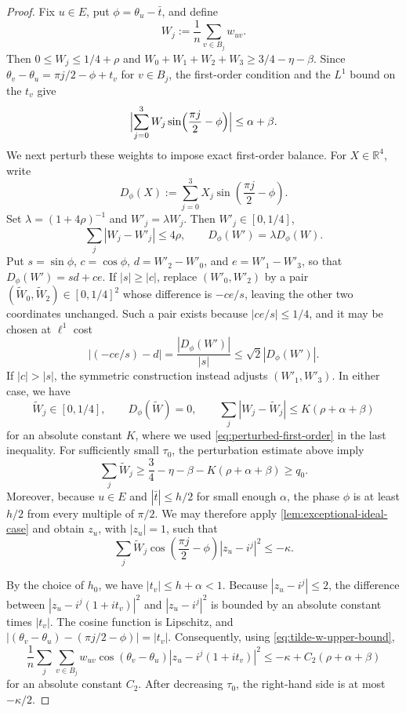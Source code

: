 \documentclass[10pt,a4paper]{amsart}
\newcommand{\RR}{\mathbb{R}}
\newcommand{\abs}[1]{\left\lvert #1\right\rvert}
\newcommand{\paren}[1]{\left(#1\right)}
\begin{document}
\begin{proof}
Fix $u\in E$, put $\phi=\theta_u-\bar t$, and define
\[
    W_j:=\frac1n\sum_{v\in B_j}w_{uv}.
\]
Then $0\le W_j\le1/4+\rho$ and $W_0 + W_1 + W_2 + W_3 \geq 3/4 - \eta - \beta$. Since $\theta_v-\theta_u=\pi j/2-\phi+t_v$ for $v\in B_j$, the
first-order condition and the $L^1$ bound on the $t_v$ give
\begin{equation}\label{eq:perturbed-first-order}
\Bigl|{\sum_{j=0}^3W_j\sin\Bigl({\frac{\pi j}{2}-\phi}\Bigr)}\Bigr|
\le\alpha+\beta.
\end{equation}
We next perturb these weights to impose exact first-order balance.  For
$X\in\RR^4$, write
\[
    D_\phi(X):=\sum_{j=0}^3X_j
        \sin\paren{\frac{\pi j}{2}-\phi}.
\]
Set $\lambda=(1+4\rho)^{-1}$ and $W'_j=\lambda W_j$.  Then
$W'_j\in[0,1/4]$,
\[
    \sum_j\abs{W_j-W'_j}\le4\rho,
    \qquad
    D_\phi(W')=\lambda D_\phi(W).
\]
Put $s=\sin\phi$, $c=\cos\phi$, $d=W'_2-W'_0$, and
$e=W'_1-W'_3$, so that $D_\phi(W')=sd+ce$.  If
$\abs s\ge\abs c$, replace $(W'_0,W'_2)$ by a pair
$(\tilde W_0,\tilde W_2)\in[0,1/4]^2$ whose difference is
$-ce/s$, leaving the other two coordinates unchanged.  Such a pair exists
because $\abs{ce/s}\le1/4$, and it may be chosen at $\ell^1$ cost
\[
    \abs{(-ce/s)-d}
    =\frac{\abs{D_\phi(W')}}{\abs s}
    \le\sqrt2|{D_\phi(W')}|.
\]
If $\abs c>\abs s$, the symmetric construction instead adjusts
$(W'_1,W'_3)$.  In either case, we have
\[
    \tilde W_j\in[0,1/4],
    \qquad
    D_\phi(\tilde W)=0,
    \qquad
    \sum_j|{W_j-\tilde W_j}|
    \le K(\rho+\alpha+\beta)
\]
for an absolute constant $K$, where we used
\eqref{eq:perturbed-first-order} in the last inequality. For sufficiently small $\tau_0$, the perturbation estimate above imply
\[
    \sum_j\tilde W_j
    \ge\frac34-\eta-\beta-K(\rho+\alpha+\beta)\ge q_0.
\]
Moreover, because $u\in E$ and
$\abs{\bar t}\le h/2$ for small enough $\alpha$, the phase $\phi$ is at least $h/2$ from every
multiple of $\pi/2$.  We may therefore apply
\cref{lem:exceptional-ideal-case} and obtain $z_u$, with
$\abs{z_u}=1$, such that
\begin{equation}\label{eq:tilde-w-upper-bound}
\sum_j\tilde W_j\cos\paren{\frac{\pi j}{2}-\phi}
\abs{z_u-i^j}^2\le-\kappa.
\end{equation}

By the choice of $h_0$, we have $|{t_v}|\le h+\alpha<1$.  Because
$|{z_u-i^j}|\le2$, the difference between
$|{z_u-i^j(1+it_v)}|^2$ and $|{z_u-i^j}|^2$ is bounded by an absolute
constant times $\abs{t_v}$.
The cosine function is Lipschitz, and $|{(\theta_v-\theta_u)-(\pi j/2-\phi)}|=|{t_v}|.$ Consequently, using \eqref{eq:tilde-w-upper-bound},
\begin{equation*}
\frac1n\sum_j\sum_{v\in B_j}
w_{uv}\cos(\theta_v-\theta_u)
\abs{z_u-i^j(1+it_v)}^2\le-\kappa+C_2(\rho+\alpha+\beta)
\end{equation*}
for an absolute constant $C_2$.
After decreasing $\tau_0$, the right-hand side is at most
$-\kappa/2$.
\end{proof}
\end{document}
